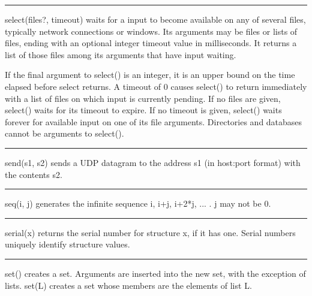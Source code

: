 \bigskip\hrule\vspace{0.1cm}

\noindent
\textsf{select(files?, timeout)} waits for a input to become available
on any of several files, typically network connections or windows. Its
arguments may be files or lists of files, ending with an optional
integer timeout value in milliseconds. It returns a list of those files
among its arguments that have input waiting.

If the final argument to \textsf{select()} is an
integer, it is an upper bound on the time elapsed before select
returns. A timeout of 0 causes \textsf{select()} to return immediately
with a list of files on which input is currently pending. If no files
are given, \textsf{select()} waits for its timeout to expire. If no
timeout is given, \textsf{select()} waits forever for available input
on one of its file arguments. Directories and databases cannot be
arguments to \textsf{select()}.

\bigskip\hrule\vspace{0.1cm}

\noindent
{}\textsf{send(s1, s2)} sends a UDP datagram to the
address \textsf{s1} (in host:port format) with the contents
\textsf{s2}.

\bigskip\hrule\vspace{0.1cm}

\noindent
{}\textsf{seq(i, j)} generates the
infinite sequence \textsf{i}, \textsf{i+j}, \textsf{i+2*j}, ... .
\textsf{j} may not be 0.

\bigskip\hrule\vspace{0.1cm}

\noindent
{}\textsf{serial(x)} returns the serial number for
structure \textsf{x}, if it has one. Serial numbers uniquely identify
structure values.

\bigskip\hrule\vspace{0.1cm}

\noindent
{}\textsf{set()} creates a set. Arguments
are inserted into the new set, with the exception of lists.
\textsf{set(L)} creates a set whose members are the elements of list
\textsf{L}.

